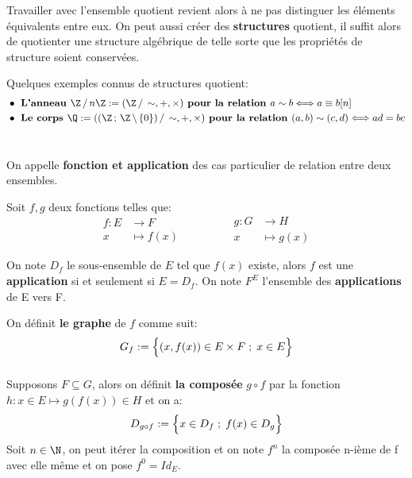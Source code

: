 Travailler avec l'ensemble quotient revient alors à ne pas distinguer les éléments équivalents entre eux.\+
On peut aussi créer des \textbf{structures} quotient, il suffit alors de quotienter une structure algébrique de telle sorte que les propriétés de structure soient conservées.\<

Quelques exemples connus de structures quotient:
\begin{align*}
    &\bullet \textbf{ L'anneau } \Z \,/\, n\Z := (\Z \,/\, \sim, +, \times) \textbf{ pour la relation } a \sim b \Longleftrightarrow a \equiv b [n] \\
    &\bullet \textbf{ Le corps } \Q := ((\Z \, ; \, \Z \, \backslash \, \{0\}) \, / \, \sim, +, \times) \textbf{ pour la relation } (a, b) \sim (c, d) \Longleftrightarrow ad = bc
\end{align*}

\chapter*{}
On appelle \textbf{fonction et application} des cas particulier de relation entre deux ensembles.\<

Soit \(f, g\) deux fonctions telles que:
\[
   \begin{aligned}
      f: E &\longrightarrow F\\
      x &\longmapsto f(x)
   \end{aligned}
      \hspace{50pt}
   \begin{aligned}
      g: G&\longrightarrow H\\
      x&\longmapsto g(x)
   \end{aligned}
\]

On note \(D_f\) le sous-ensemble de \(E\) tel que \(f(x)\) existe, alors \(f\) est une \textbf{application} si et seulement si \(E = D_f\).\+
On note \(F^E\) l'ensemble des \textbf{applications} de E vers F.\<

On définit \textbf{le graphe} de \(f\) comme suit:
\[
   G_f:= \Bigl\{ (x, f(x)) \in E \times F \; ; \; x \in E\Bigl\}   
\]

\subsection*{}
Supposons \(F \subseteq G\), alors on définit \textbf{la composée} \(g \circ f\) par la fonction \(h: x \in E \longmapsto g(f(x)) \in H\) et on a:
\[
   D_{g \circ f} := \Bigl\{ x \in D_f \; ; \; f(x) \in D_g \Bigl\}   
\]
Soit \(n \in \N\), on peut itérer la composition et on note \(f^{n}\) la composée n-ième de f avec elle même et on pose \(f^0 = Id_E\).
